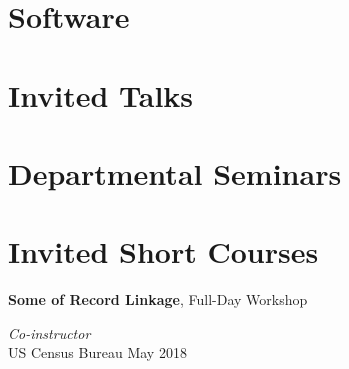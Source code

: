 \documentclass[margin,line]{res}
\begin{document}
\begin{resume}
 
 
 

\section{\sc Software}
\printbibliography[keyword=packages, heading=none, resetnumbers=true]

\section{\sc Invited Talks}
\printbibliography[keyword=talk-invited, heading=none, resetnumbers=true]

\section{\sc Departmental Seminars}
\printbibliography[keyword=seminar, heading=none, resetnumbers=true]

\section{\sc Invited Short Courses}

{\bf Some of Record Linkage},  Full-Day Workshop

\vspace{-.4cm}
{\em Co-instructor} \hfill \\

\vspace{-.7cm}
US Census Bureau \hfill May 2018 \\


\end{resume}
\end{document}
